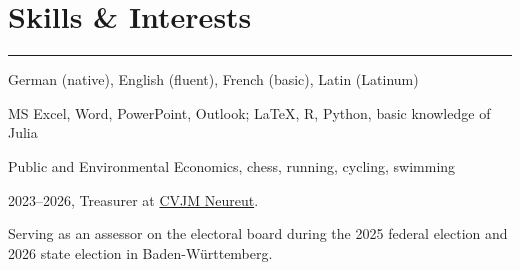 \documentclass[a4paper,11pt]{article}
\newcommand{\sectionline}{\vspace{-0.4cm}\noindent\textcolor{gray}{\rule{\textwidth}{0.8pt}}\vspace{0.2cm}}
\begin{document}
\section*{Skills \& Interests}
\sectionline
\begin{description}[style=nextline, labelwidth=4cm, labelsep=1cm, leftmargin=5cm, itemsep=0.5em]
    \item[Languages] German (native), English (fluent), French (basic), Latin (Latinum)
    \item[IT Skills] MS Excel, Word, PowerPoint, Outlook; LaTeX, R, Python, basic knowledge of Julia
    \item[Interests] Public and Environmental Economics, chess, running, cycling, swimming
    \item[Volunteering] 2023--2026, Treasurer at \href{https://www.cvjm-neureut.de/}{CVJM Neureut}.

    Serving as an assessor on the electoral board during the 2025 federal election and 2026 state election in Baden-Württemberg. 
\end{description}
\end{document}

